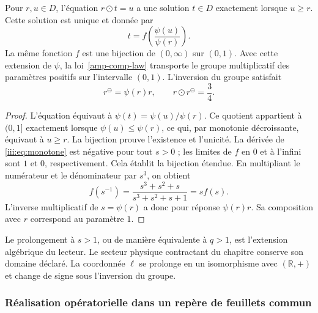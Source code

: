 \begin{proposition}
\label{amp-comp-inverse}
Pour $r,u\in D$, l’équation $r\odot t=u$ a une solution $t\in D$
exactement lorsque $u\geq r$. Cette solution est unique et donnée par
\begin{equation}
 t=f\!\left(\frac{\psi(u)}{\psi(r)}\right).
 \label{amp-comp-cancellation}
\end{equation}
La même fonction $f$ est une bijection de $(0,\infty)$ sur $(0,1)$.
Avec cette extension de $\psi$, la loi~\eqref{amp-comp-law} transporte le
groupe multiplicatif des paramètres positifs sur l’intervalle $(0,1)$.
L’inversion du groupe satisfait
\begin{equation}
 r^{\ominus}=\psi(r)r,\qquad
 r\odot r^{\ominus}=\frac34.
 \label{amp-comp-group-inverse}
\end{equation}
\end{proposition}
\begin{proof}
L’équation équivaut à
$\psi(t)=\psi(u)/\psi(r)$. Ce quotient appartient à $(0,1]$
exactement lorsque $\psi(u)\leq\psi(r)$, ce qui, par monotonie décroissante,
équivaut à $u\geq r$. La bijection prouve l’existence et l’unicité.
La dérivée de \eqref{iii:eq:monotone} est négative pour tout $s>0$ ;
les limites de $f$ en $0$ et à l’infini sont $1$ et $0$, respectivement.
Cela établit la bijection étendue. En multipliant le numérateur et le
dénominateur par $s^3$, on obtient
\[
 f(s^{-1})=\frac{s^3+s^2+s}{s^3+s^2+s+1}=s f(s).
\]
L’inverse multiplicatif de $s=\psi(r)$ a donc pour réponse
$\psi(r)r$. Sa composition avec $r$ correspond au paramètre $1$.
\end{proof}

Le prolongement à $s>1$, ou de manière équivalente à $q>1$, est l’extension
algébrique du lecteur. Le secteur physique contractant du chapitre conserve
son domaine déclaré. La coordonnée $\ell$ se prolonge en un isomorphisme
avec $(\mathbb R,+)$ et change de signe sous l’inversion du groupe.

\subsubsection{Réalisation opératorielle dans un repère de feuillets commun}

